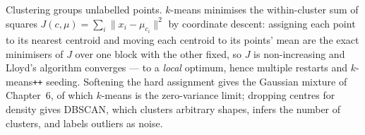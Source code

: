 \documentclass[11pt]{article}
\begin{document}
\begin{summarybox}
Clustering groups unlabelled points. $k$-means minimises the within-cluster
sum of squares $J(c,\mu)=\sum_i\|x_i-\mu_{c_i}\|^2$ by coordinate descent:
assigning each point to its nearest centroid and moving each centroid to its
points' mean are the exact minimisers of $J$ over one block with the other
fixed, so $J$ is non-increasing and Lloyd's algorithm converges --- to a
\emph{local} optimum, hence multiple restarts and $k$-means\texttt{++}
seeding. Softening the hard assignment gives the Gaussian mixture of
Chapter~6, of which $k$-means is the zero-variance limit; dropping centres for
density gives DBSCAN, which clusters arbitrary shapes, infers the number of
clusters, and labels outliers as noise.
\end{summarybox}
\end{document}
